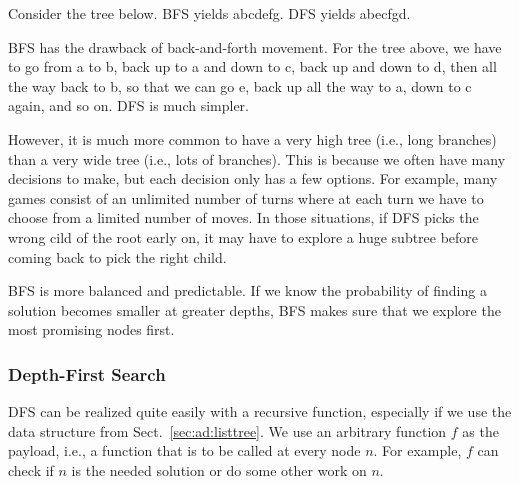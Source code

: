 Consider the tree below.
BFS yields abcdefg.
DFS yields abecfgd.
\begin{center}
\end{center}

BFS has the drawback of back-and-forth movement.
For the tree above, we have to go from a to b, back up to a and down to c, back up and down to d, then all the way back to b, so that we can go e, back up all the way to a, down to c again, and so on.
DFS is much simpler.

However, it is much more common to have a very high tree (i.e., long branches) than a very wide tree (i.e., lots of branches).
This is because we often have many decisions to make, but each decision only has a few options.
For example, many games consist of an unlimited number of turns where at each turn we have to choose from a limited number of moves.
In those situations, if DFS picks the wrong cild of the root early on, it may have to explore a huge subtree before coming back to pick the right child.

BFS is more balanced and predictable.
If we know the probability of finding a solution becomes smaller at greater depths, BFS makes sure that we explore the most promising nodes first.

\subsubsection{Depth-First Search}

DFS can be realized quite easily with a recursive function, especially if we use the data structure from Sect.~\ref{sec:ad:listtree}.
We use an arbitrary function $f$ as the payload, i.e., a function that is to be called at every node $n$.
For example, $f$ can check if $n$ is the needed solution or do some other work on $n$.

\begin{acode}
\end{acode}

